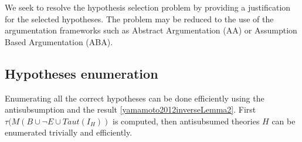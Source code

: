 We seek to resolve the hypothesis selection problem by providing a justification for the selected hypotheses. The problem may be reduced to the use of the argumentation frameworks such as Abstract Argumentation (AA) or Assumption Based Argumentation (ABA).
\subsection{Hypotheses enumeration}
Enumerating all the correct hypotheses can be done efficiently using the antisubsumption and the result \ref{yamamoto2012inverseLemma2}. First $\tau(M(B \cup \neg E \cup Taut(I_H))$ is computed, then antisubsumed theories $H$ can be enumerated trivially and efficiently.
